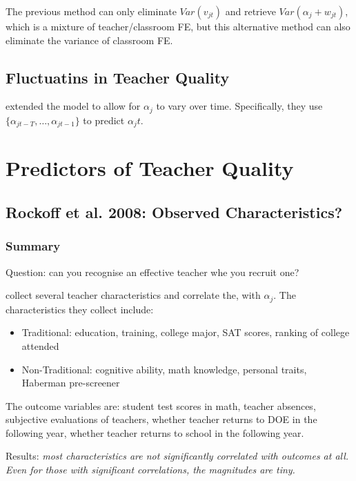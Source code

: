         The previous method can only eliminate $Var(v_{jt})$ and retrieve $Var(\alpha_j + w_{jt})$, which is a mixture of teacher/classroom FE, but this alternative method can also eliminate the variance of classroom FE.
        
    \subsection{Fluctuatins in Teacher Quality}

        \cite{chetty_measuring_2014} extended the model to allow for $\alpha_j$ to vary over time. Specifically, they use $\{ \alpha_{jt-T},\dots,\alpha_{jt-1} \}$ to predict $\alpha_jt$.

\section{Predictors of Teacher Quality}

    \subsection{Rockoff et al. 2008: Observed Characteristics?}

        \subsubsection{Summary}

            Question: can you recognise an effective teacher whe you recruit one?
    
            \cite{rockoff_can_2011} collect several teacher characteristics and correlate the, with $\alpha_j$. The characteristics they collect include:
            \begin{itemize}
                \item Traditional: education, training, college major, SAT scores, ranking of college attended
                \item Non-Traditional: cognitive ability, math knowledge, personal traits, Haberman pre-screener
            \end{itemize}
            The outcome variables are: student test scores in math, teacher absences, subjective evaluations of teachers, whether teacher returns to DOE in the following year, whether  teacher returns to school in the following year.
    
            Results: \emph{most characteristics are not significantly correlated with outcomes at all. Even for those with significant correlations, the magnitudes are tiny.}

